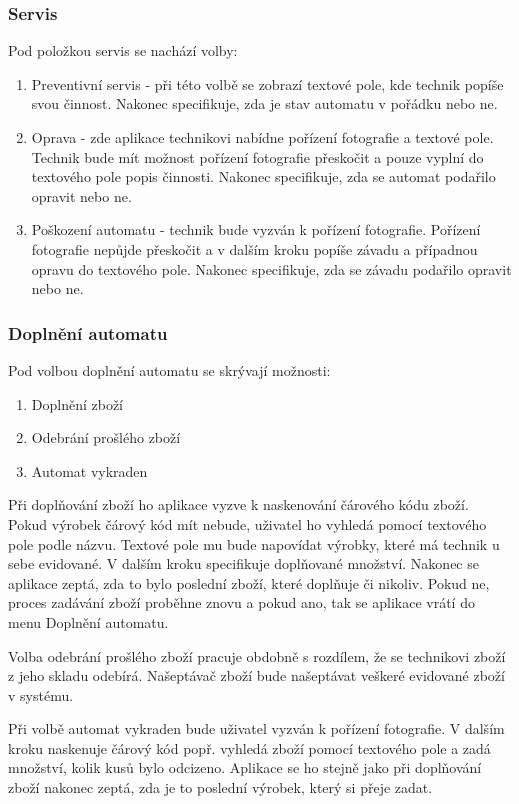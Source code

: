 \documentclass[a4paper,10pt]{article}
\begin{document}
\subsubsection{Servis}
Pod položkou servis se nachází volby:
\begin{enumerate}
	\item Preventivní servis - při této volbě se zobrazí textové pole, kde technik popíše svou činnost. Nakonec specifikuje, zda je stav automatu v pořádku nebo ne.
	\item Oprava - zde aplikace technikovi nabídne pořízení fotografie a textové pole. Technik bude mít možnost pořízení fotografie přeskočit a pouze vyplní do textového pole popis činnosti. Nakonec specifikuje, zda se automat podařilo opravit nebo ne.
	\item Poškození automatu - technik bude vyzván k pořízení fotografie. Pořízení fotografie nepůjde přeskočit a v dalším kroku popíše závadu a případnou opravu do textového pole. Nakonec specifikuje, zda se závadu podařilo opravit nebo ne.
\end{enumerate}

\subsubsection{Doplnění automatu}
Pod volbou doplnění automatu se skrývají možnosti:
\begin{enumerate}
	\item Doplnění zboží
	\item Odebrání prošlého zboží
	\item Automat vykraden
\end{enumerate}

Při doplňování zboží ho aplikace vyzve k naskenování čárového kódu zboží. Pokud výrobek čárový kód mít nebude, uživatel ho vyhledá pomocí textového pole podle názvu. Textové pole mu bude napovídat výrobky, které má technik u sebe evidované. V dalším kroku specifikuje doplňované množství. Nakonec se aplikace zeptá, zda to bylo poslední zboží, které doplňuje či nikoliv. Pokud ne, proces zadávání zboží proběhne znovu a pokud ano, tak se aplikace vrátí do menu Doplnění automatu.

Volba odebrání prošlého zboží pracuje obdobně s rozdílem, že se technikovi zboží z jeho skladu odebírá. Našeptávač zboží bude našeptávat veškeré evidované zboží v systému.

Při volbě automat vykraden bude uživatel vyzván k pořízení fotografie. V dalším kroku naskenuje čárový kód popř. vyhledá zboží pomocí textového pole a zadá množství, kolik kusů bylo odcizeno. Aplikace se ho stejně jako při doplňování zboží nakonec zeptá, zda je to poslední výrobek, který si přeje zadat.
\end{document}
